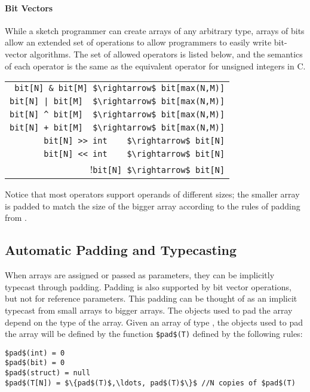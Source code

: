 \paragraph{Bit Vectors}
While a sketch programmer can create arrays of any arbitrary type, arrays of bits allow an extended set of operations to allow programmers to easily write bit-vector algorithms. The set of allowed operators is listed below, and the semantics of each operator is the same as the equivalent operator for unsigned integers in C.
\begin{center}
\begin{tabular}{r}
\lstinline!bit[N] & bit[M] $\rightarrow$ bit[max(N,M)]!\\
\lstinline!bit[N] | bit[M]  $\rightarrow$ bit[max(N,M)]!\\
\lstinline!bit[N] ^ bit[M]  $\rightarrow$ bit[max(N,M)]!\\
\lstinline!bit[N] + bit[M]  $\rightarrow$ bit[max(N,M)]!\\
\lstinline!bit[N] >> int    $\rightarrow$ bit[N]!\\
\lstinline!bit[N] << int    $\rightarrow$ bit[N]!\\
!\lstinline!bit[N] $\rightarrow$ bit[N]!\\
\end{tabular}
\end{center}

Notice that most operators support operands of different sizes; the smaller array is padded to match the size of the bigger array according to the rules of padding from . 




\subsection{Automatic Padding and Typecasting}
When arrays are assigned or passed as parameters, they can be implicitly typecast through padding. Padding is also supported by bit vector operations, but not for reference parameters. This padding can be thought of as an implicit typecast from small arrays to bigger arrays. The objects used to pad the array depend on the type of the array. Given an array of type , the objects used to pad the array will be defined by the function \lstinline!$pad$(T)! defined by the following rules:
\begin{lstlisting}
$pad$(int) = 0 
$pad$(bit) = 0
$pad$(struct) = null
$pad$(T[N]) = $\{pad$(T)$,\ldots, pad$(T)$\}$ //N copies of $pad$(T)
\end{lstlisting}

